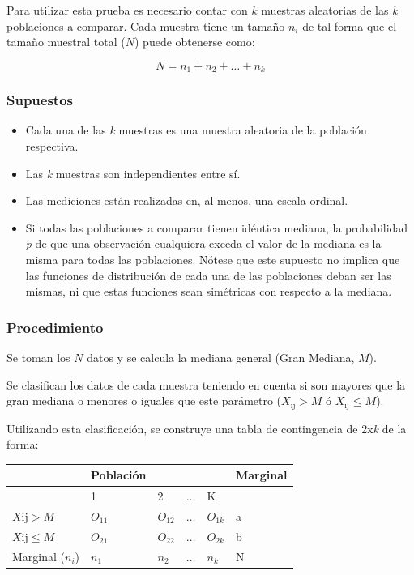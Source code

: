 \documentclass[]{book}
\theoremstyle{definition}
\theoremstyle{definition}
\theoremstyle{definition}
\theoremstyle{remark}
\begin{document}
Para utilizar esta prueba es necesario contar con \(k\) muestras
aleatorias de las \emph{k} poblaciones a comparar. Cada muestra tiene un
tamaño \(n_{i}\) de tal forma que el tamaño muestral total (\(N\)) puede
obtenerse como:

\[
N = n_{1} + n_{2} + \ldots  + n_{k}
\]

\hypertarget{supuestos-2}{%
\subsubsection{Supuestos}\label{supuestos-2}}

\begin{itemize}
\item
  Cada una de las \emph{k} muestras es una muestra aleatoria de la
  población respectiva.
\item
  Las \emph{k} muestras son independientes entre sí.
\item
  Las mediciones están realizadas en, al menos, una escala ordinal.
\item
  Si todas las poblaciones a comparar tienen idéntica mediana, la
  probabilidad \emph{p} de que una observación cualquiera exceda el
  valor de la mediana es la misma para todas las poblaciones. Nótese que
  este supuesto no implica que las funciones de distribución de cada una
  de las poblaciones deban ser las mismas, ni que estas funciones sean
  simétricas con respecto a la mediana.
\end{itemize}

\hypertarget{procedimiento}{%
\subsubsection{Procedimiento}\label{procedimiento}}

Se toman los \(N\) datos y se calcula la mediana general (Gran Mediana,
\(M\)).

Se clasifican los datos de cada muestra teniendo en cuenta si son
mayores que la gran mediana o menores o iguales que este parámetro
(\(X_{\text{ij}} > M\) ó \(X_{\text{ij}} \leq M\)).

Utilizando esta clasificación, se construye una tabla de contingencia de
2x\emph{k} de la forma:

\begin{longtable}[]{@{}llllll@{}}
\toprule
& Población & & & & Marginal\tabularnewline
\midrule
\endhead
& 1 & 2 & \(\ldots\) & K &\tabularnewline
\(X\text{ij} > M\) & \(O_{11}\) & \(O_{12}\) & \(\ldots\) & \(O_{1k}\) &
a\tabularnewline
\(X\text{ij} \leq M\) & \(O_{21}\) & \(O_{22}\) & \(\ldots\) &
\(O_{2k}\) & b\tabularnewline
Marginal (\(n_i\)) & \(n_{1}\) & \(n_{2}\) & \(\ldots\) & \(n_{k}\) &
N\tabularnewline
\bottomrule
\end{longtable}
\end{document}
